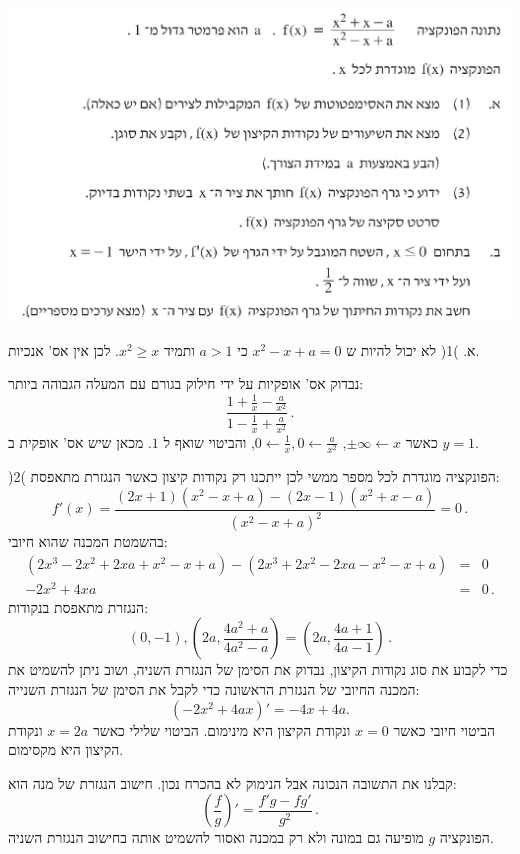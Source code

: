 \documentclass[12pt,a4paper]{article}
\begin{document}
\begin{center}
\includegraphics[width=.8\textwidth]{winter-2014-6}
\end{center}

א. )1( לא יכול להיות ש
$x^2-x+a=0$
כי
$a>1$
ותמיד
$x^2 \geq x$.
לכן אין אס' אנכיות.

נבדוק אס' אופקיות על ידי חילוק בגורם עם המעלה הגבוהה ביותר:
\[
\frac{1+\frac{1}{x}-\frac{a}{x^2}}{1-\frac{1}{x}+\frac{a}{x^2}}\,.
\]
כאשר
$\pm \infty \leftarrow x$,
$0 \leftarrow \frac{1}{x}, 0 \leftarrow \frac{a}{x^2}$,
והביטוי שואף ל
$1$.
מכאן שיש אס' אופקית ב
$y=1$.

\medskip

)2( הפונקציה מוגדרת לכל מספר ממשי לכן ייתכנו רק נקודות קיצון כאשר הנגזרת מתאפסת:
\[
f'(x) = \frac{(2x+1)(x^2-x+a)-(2x-1)(x^2+x-a)}{(x^2-x+a)^2} = 0\,.
\]
בהשמטת המכנה שהוא חיובי:
\begin{eqnarray*}
(2x^3 - 2x^2 +2xa + x^2 - x + a) -
(2x^3 + 2x^2 -2xa - x^2 - x + a) &=&0\\
-2x^2+4xa &=& 0\,.
\end{eqnarray*}
הנגזרת מתאפסת בנקודות:
\[
(0,-1), \left(2a,\frac{4a^2+a}{4a^2-a}\right)=\left(2a,\frac{4a+1}{4a-1}\right)\,.
\]
כדי לקבוע את סוג נקודות הקיצון, נבדוק את הסימן של הנגזרת השניה, ושוב ניתן להשמיט את המכנה החיובי של הנגזרת הראשונה כדי לקבל את הסימן של הנגזרת השנייה:
\[
(-2x^2+4ax)' = -4x + 4a.
\]
הביטוי חיובי כאשר 
$x=0$
ונקודת הקיצון היא מינימום. הביטוי שלילי כאשר
$x=2a$
ונקודת הקיצון היא מקסימום.

\medskip

\textbf{}
קבלנו את התשובה הנכונה אבל הנימוק לא בהכרח נכון. חישוב הנגזרת של מנה הוא:
\[
\left(\frac{f}{g}\right)' = \frac{f'g - fg'}{g^2}\,.
\]
הפונקציה
$g$
מופיעה גם במונה ולא רק במכנה ואסור להשמיט אותה בחישוב הנגזרת השניה.

\medskip
\end{document}

